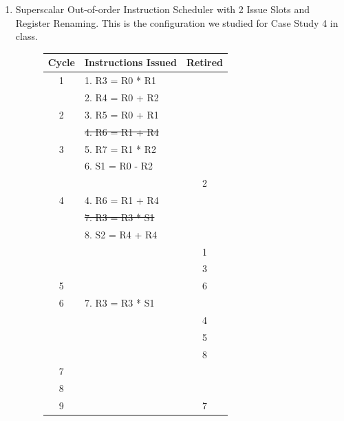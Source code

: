 \documentclass{article}
\begin{document}
\begin{enumerate}
    \item Superscalar Out-of-order Instruction Scheduler with 2 Issue Slots and Register Renaming. This is the configuration we studied for Case Study 4 in class. 
    \begin{figure}[H]
        \centering
        \begin{minipage}[t]{0.45\textwidth}
            \centering
            \renewcommand{\arraystretch}{0.9} %
            \setlength{\tabcolsep}{3pt} %
            \begin{tabular}{|c|p{3.4cm}|c|}
                \hline
                \textbf{Cycle} & \textbf{Instructions Issued} & \textbf{Retired} \\ \hline
                1 & 1. R3 = R0 * R1 & \\ 
                  & 2. R4 = R0 + R2 & \\ \hline
                2 & 3. R5 = R0 + R1 & \\ 
                  & \sout{4. R6 = R1 + R4} & \\ \hline
                3 & 5. R7 = R1 * R2 & \\ 
                  & 6. S1 = R0 - R2 & \\
                  & & 2 \\ \hline 
                4 & 4. R6 = R1 + R4 & \\ 
                  & \sout{7. R3 = R3 * S1} & \\
                  & 8. S2 = R4 + R4 & \\
                  & & 1 \\
                  & & 3 \\ \hline 
                5 & & 6 \\ \hline 
                6 & 7. R3 = R3 * S1 & \\
                & & 4 \\ 
                & & 5 \\ 
                & & 8 \\ \hline 
                7 & & \\ \hline 
                8 & & \\ \hline 
                9 & & 7 \\ \hline 
            \end{tabular}
        \end{minipage}
        \begin{minipage}[t]{0.45\textwidth}
            \centering
            \renewcommand{\arraystretch}{1.2} %

\end{minipage}
\end{figure}
\end{enumerate}
\end{document}
